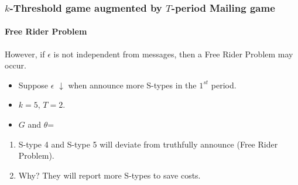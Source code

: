 \documentclass[8pt]{beamer}
\begin{document}
\begin{frame}
   \frametitle{$k$-Threshold game augmented by $T$-period Mailing game}
\framesubtitle{Free Rider Problem}

\alert{However}, if $\epsilon$ is \alert{not independent from messages}, then a \alert{Free Rider Problem} may occur.
\begin{itemize}
\item Suppose $\epsilon$ \alert{$\downarrow$} when announce \alert{more} S-types in the \alert{$1^{st}$} period.
\item $k=5$, $T=2$.
\item $G$ and $\theta$=
\begin{center}
\end{center}



\end{itemize}

\begin{enumerate}
\item S-type \alert{4} and S-type \alert{5} will deviate from truthfully announce ({Free Rider Problem}). 
\item Why? They will report more S-types to save costs.
\end{enumerate}


\end{frame}
\end{document}
